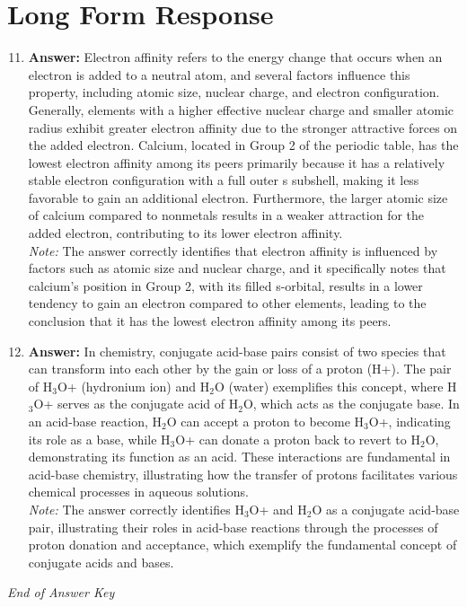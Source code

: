 \documentclass[12pt]{article}
\begin{document}
\section*{Long Form Response}
\begin{enumerate}[label=\arabic*.]
\setcounter{enumi}{10}
\item \textbf{Answer:} Electron affinity refers to the energy change that occurs when an electron is added to a neutral atom, and several factors influence this property, including atomic size, nuclear charge, and electron configuration. Generally, elements with a higher effective nuclear charge and smaller atomic radius exhibit greater electron affinity due to the stronger attractive forces on the added electron. Calcium, located in Group 2 of the periodic table, has the lowest electron affinity among its peers primarily because it has a relatively stable electron configuration with a full outer s subshell, making it less favorable to gain an additional electron. Furthermore, the larger atomic size of calcium compared to nonmetals results in a weaker attraction for the added electron, contributing to its lower electron affinity.
\\ \textit{Note:} The answer correctly identifies that electron affinity is influenced by factors such as atomic size and nuclear charge, and it specifically notes that calcium's position in Group 2, with its filled s-orbital, results in a lower tendency to gain an electron compared to other elements, leading to the conclusion that it has the lowest electron affinity among its peers.
\item \textbf{Answer:} In chemistry, conjugate acid-base pairs consist of two species that can transform into each other by the gain or loss of a proton (H+). The pair of H$_{3}$O+ (hydronium ion) and H$_{2}$O (water) exemplifies this concept, where H$_{3}$O+ serves as the conjugate acid of H$_{2}$O, which acts as the conjugate base. In an acid-base reaction, H$_{2}$O can accept a proton to become H$_{3}$O+, indicating its role as a base, while H$_{3}$O+ can donate a proton back to revert to H$_{2}$O, demonstrating its function as an acid. These interactions are fundamental in acid-base chemistry, illustrating how the transfer of protons facilitates various chemical processes in aqueous solutions.
\\ \textit{Note:} The answer correctly identifies H$_{3}$O+ and H$_{2}$O as a conjugate acid-base pair, illustrating their roles in acid-base reactions through the processes of proton donation and acceptance, which exemplify the fundamental concept of conjugate acids and bases.
\end{enumerate}

\vfill
\noindent\textit{End of Answer Key}
\end{document}
